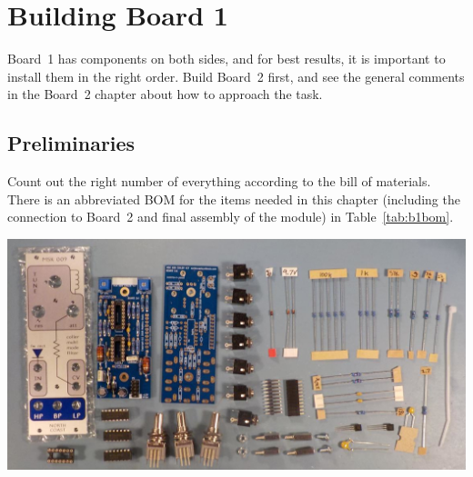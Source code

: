 
%
%
%
%
%
%


\chapter{Building Board 1}\label{ch:board1}

Board~1 has components on both sides, and for best results, it is important
to install them in the right order.  Build Board~2 first, and see the
general comments in the Board~2 chapter about how to approach the task.

\section{Preliminaries}

Count out the right number of everything according to the bill of materials. 
There is an abbreviated BOM for the items needed in this chapter (including
the connection to Board~2 and final assembly of the module) in
Table~\ref{tab:b1bom}.

\nopagebreak
\noindent\includegraphics[width=\linewidth]{board1-parts.jpg}

